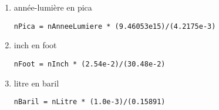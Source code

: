 \documentclass[11pt,a4paper]{article}
\begin{document}
\begin{enumerate}
\item année-lumière en pica\hfill
\begin{minipage}[t]{9.5cm}
\begin{Verbatim}
nPica = nAnneeLumiere * (9.46053e15)/(4.2175e-3)
\end{Verbatim}
\end{minipage}

\item inch en foot\hfill
\begin{minipage}[t]{9.5cm}
\begin{Verbatim}
nFoot = nInch * (2.54e-2)/(30.48e-2)
\end{Verbatim}
\end{minipage}

\item litre en baril\hfill
\begin{minipage}[t]{9.5cm}
\begin{Verbatim}
nBaril = nLitre * (1.0e-3)/(0.15891)
\end{Verbatim}
\end{minipage}


\end{enumerate}


\end{document}

